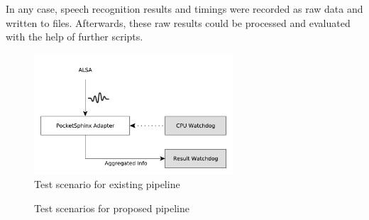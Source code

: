 In any case, speech recognition results and timings were recorded as raw data and written to files.
Afterwards, these raw results could be processed and evaluated with the help of further scripts.


\begin{figure}[]
	\centering
	\includegraphics[width=0.66\textwidth]{diagrams/eval_pipeline_1.pdf}
	\caption{Test scenario for existing pipeline}
	\label{pic:eval_p1_diag}
\end{figure}

\begin{figure}[]	
	\centering
	
	\caption{Test scenarios for proposed pipeline}
	\label{pic:eval_p2_4_diag}
\end{figure}


